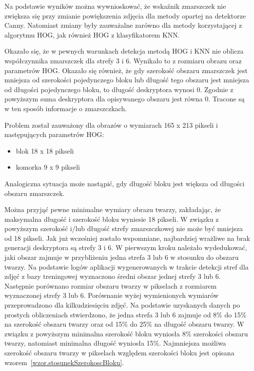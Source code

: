 \documentclass[a4paper,twoside,12pt]{book}
\begin{document}
    Na podstawie wyników można wywnioskować, że wskaźnik zmarszczek nie zwiększa się przy zmianie
    powiększenia zdjęcia dla metody opartej na detektorze Canny. Natomiast zmiany były zauważalne zarówno dla metody
    korzystającej z algorytmu HOG, jak również HOG z klasyfikatorem KNN.

    Okazało się, że w pewnych warunkach detekcja metodą HOG i KNN nie oblicza współczynnika zmarszczek dla strefy 3
    i 6.
    Wynikało to z rozmiaru obrazu oraz parametrów HOG.
    Okazało się również, że gdy szerokość obszaru zmarszczek jest mniejsza od szerokości pojedynczego bloku lub długość tego
    obszaru jest mniejsza od długości pojedynczego bloku,
    to długość deskryptora wynosi 0. Zgodnie z powyższym suma deskryptora dla opisywanego obszaru jest równa 0.
    Tracone są w ten sposób informacje o zmarszczkach.

    Problem został zauważony dla obrazów o wymiarach 165 x 213 pikseli i następujących parametrów HOG:
    \begin{itemize}
        \item blok 18 x 18 pikseli
        \item komorka 9 x 9 pikseli
    \end{itemize}
    Analogiczna sytuacja może nastąpić, gdy długość bloku jest większa od długości obszaru zmarszczek.

    Można przyjąć pewne minimalne wymiary obrazu twarzy, zakładając, że maksymalna długość i szerokość bloku wyniesie 18 pikseli.
    W związku z powyższym szerokość i/lub długość strefy zmarszczkowej nie może być mniejsza od 18 pikseli.
    Jak już wcześniej zostało wspomniane, najbardziej wrażliwe na brak generacji deskryptora są strefy 3
    i 6.
    W pierwszym kroku należało wydedukować, jaki obszar zajmuje w przybliżeniu jedna strefa 3 lub 6 w stosunku do obszaru twarzy.
    Na podstawie logów aplikacji wygenerowanych w trakcie detekcji stref dla zdjęć z bazy treningowej wyznaczono
    średni obszar jednej strefy 3 lub 6. Następnie porównano rozmiar obszaru twarzy w pikselach z rozmiarem wyznaczonej strefy 3 lub 6.
    Porównanie wyżej wymienionych wymiarów przeprowadzono dla kilkudziesięciu zdjęć. Na podstawie uzyskanych danych po prostych
    obliczeniach stwierdzono, że jedna strefa 3 lub 6 zajmuje od 8\% do 15\% na szerokość obszaru twarzy oraz od 15\% do 25\%
    na długość obszaru twarzy.
    W związku z powyższym minimalna szerokość bloku wyniosła 8\% szerokości obszaru twarzy, natomiast minimalna długość wyniosła 15\%.
    Najmniejsza możliwa szerokość obszaru twarzy w pikselach względem szerokości bloku jest opisana wzorem~\ref{wzor.stosunekSzerokoscBloku}.
\end{document}
